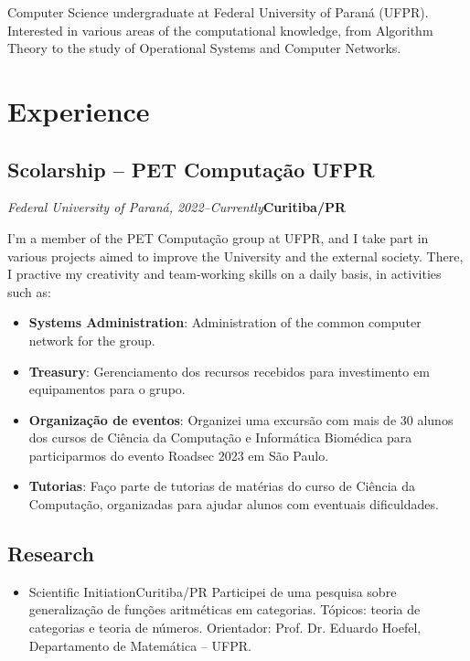 \documentclass[a4paper, 12pt]{moderncv}
\begin{document}
\makecvtitle

\small{Computer Science undergraduate at Federal University of Paraná (UFPR).
Interested in various areas of the computational knowledge, from Algorithm
Theory to the study of Operational Systems and Computer Networks.}

\section{Experience}
\vspace{1pt}
\subsection{\small{Scolarship -- PET Computação UFPR}}
\textit{Federal University of Paraná, 2022--Currently}\hspace{190pt}\textbf{Curitiba/PR}

\vspace{3pt}
I'm a member of the PET Computação group at UFPR, and I take part in various
projects aimed to improve the University and the external society. There, I
practive my creativity and team-working skills on a daily basis, in activities
such as:
\vspace{4pt}
\begin{itemize}
    \item{\textbf{Systems Administration}: Administration of the common computer
          network for the group.}
    \item{\textbf{Treasury}: Gerenciamento dos recursos recebidos para investimento
          em equipamentos para o grupo.}
    \item{\textbf{Organização de eventos}: Organizei uma excursão com mais de
          30 alunos dos cursos de Ciência da Computação e Informática Biomédica
          para participarmos do evento Roadsec 2023 em São Paulo.}
    \item{\textbf{Tutorias}: Faço parte de tutorias de matérias do curso de Ciência
          da Computação, organizadas para ajudar alunos com eventuais dificuldades.}
\end{itemize}

\vspace{4pt}
\subsection{\small{Research}}
\begin{itemize}
    \item{
        {Scientific Initiation}{Curitiba/PR}{}
        {Participei de uma pesquisa sobre generalização de funções aritméticas em
         categorias. Tópicos: teoria de categorias e teoria de números. Orientador:
         Prof. Dr. Eduardo Hoefel, Departamento de Matemática -- UFPR.}}
\end{itemize}
\end{document}
